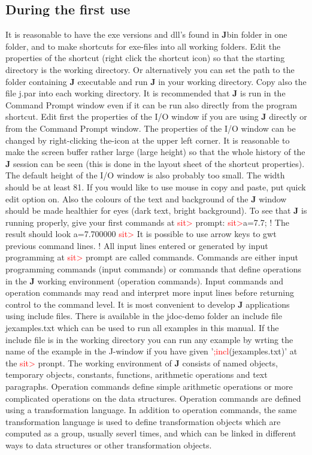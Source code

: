 \subsection{During the first use}
\label{firstuse}
It is reasonable to have the exe versions and dll's found in
\textbf{J}bin folder in one folder, and to make shortcuts for exe-files
into all working folders. Edit the properties of the shortcut (right click the
shortcut icon) so that the starting directory is the working directory. Or
alternatively you can set the path to the folder containing \textbf{J} executable and
run \textbf{J} in your working directory. Copy also the file j.par into each working
directory.
It is recommended that \textbf{J} is run in the Command Prompt window even if it can be
run also directly from the program shortcut.
Edit first the properties of the I/O window if you are using \textbf{J} directly or from
the Command Prompt window. The properties of the I/O window can be changed by
right-clicking the-icon at the upper left corner. It is reasonable to make the
screen buffer rather large (large height) so that the whole history of the \textbf{J}
session can be seen (this is done in the layout sheet of the shortcut
properties). The default height of the I/O window is also probably too small.
The width should be at least 81. If you would like to use mouse in copy and
paste, put quick edit option on. Also the colours of the text and background of
the \textbf{J} window should be made healthier for eyes (dark text, bright background).
To see that \textbf{J} is running properly, give your first commands at \textcolor{Red}{sit>} prompt:
\textcolor{Red}{sit>}a=7.7;
!
The result should look
a=7.700000
\textcolor{Red}{sit>}
It is possible to use arrow keys to gwt previous command lines.
!
All input lines entered or generated by input programming at \textcolor{Red}{sit>} prompt are
called commands. Commands are either input programming commands (input
commands) or commands that define operations in the \textbf{J} working environment
(operation commands). Input commands and operation commands may read and
interpret more input lines before returning control to the command level.
It is most convenient to develop \textbf{J} applications using include files. There is
available in the jdoc-demo folder an include file jexamples.txt
which can be used to run all examples in this manual. If the include file
is in the working directory you can run any example by wrting the name of the example
in the J-window if you have given '\textcolor{Red}{;incl}(jexamples.txt)' at the \textcolor{Red}{sit>} pronpt.
The working environment of \textbf{J} consists of named objects, temporary objects,
constants, functions, arithmetic operations and text paragraphs. Operation
commands define simple arithmetic operations or more complicated operations on
the data structures. Operation commands are defined using a transformation
language. In addition to operation commands, the same transformation language
is used to define transformation objects which are computed as a group, usually severl times,
and which
can be linked in different ways to data structures or other
transformation objects.

